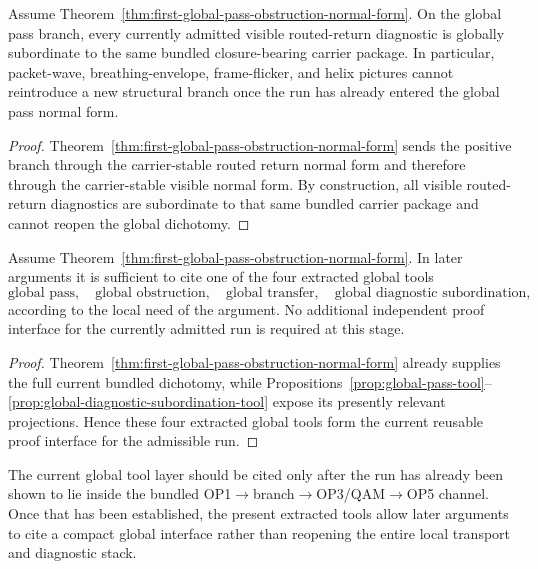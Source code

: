 \begin{proposition}
\label{prop:global-diagnostic-subordination-tool}
Assume Theorem~\ref{thm:first-global-pass-obstruction-normal-form}. On the global pass branch, every currently admitted visible routed-return diagnostic is globally subordinate to the same bundled closure-bearing carrier package. In particular, packet-wave, breathing-envelope, frame-flicker, and helix pictures cannot reintroduce a new structural branch once the run has already entered the global pass normal form.
\end{proposition}

\begin{proof}
Theorem~\ref{thm:first-global-pass-obstruction-normal-form} sends the positive branch through the carrier-stable routed return normal form and therefore through the carrier-stable visible normal form. By construction, all visible routed-return diagnostics are subordinate to that same bundled carrier package and cannot reopen the global dichotomy.
\end{proof}

\begin{proposition}
\label{prop:global-proof-interface-tool}
Assume Theorem~\ref{thm:first-global-pass-obstruction-normal-form}. In later arguments it is sufficient to cite one of the four extracted global tools
\[
\text{global pass},\quad
\text{global obstruction},\quad
\text{global transfer},\quad
\text{global diagnostic subordination},
\]
according to the local need of the argument. No additional independent proof interface for the currently admitted run is required at this stage.
\end{proposition}

\begin{proof}
Theorem~\ref{thm:first-global-pass-obstruction-normal-form} already supplies the full current bundled dichotomy, while Propositions~\ref{prop:global-pass-tool}--\ref{prop:global-diagnostic-subordination-tool} expose its presently relevant projections. Hence these four extracted global tools form the current reusable proof interface for the admissible run.
\end{proof}

\begin{remark}
The current global tool layer should be cited only after the run has already been shown to lie inside the bundled OP1$\to$branch$\to$OP3/QAM$\to$OP5 channel. Once that has been established, the present extracted tools allow later arguments to cite a compact global interface rather than reopening the entire local transport and diagnostic stack.
\end{remark}


